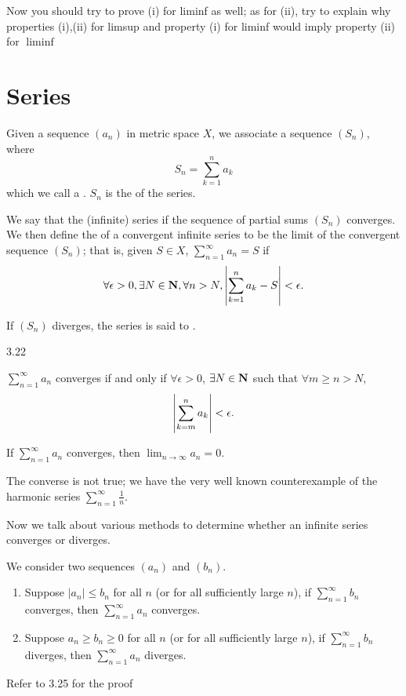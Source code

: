 Now you should try to prove (i) for liminf as well; as for (ii), try to explain why properties (i),(ii) for limsup and property (i) for liminf would imply property (ii) for $\liminf$

\section{Series}
\begin{definition}[Series]
Given a sequence $(a_n)$ in metric space $X$, we associate a sequence $(S_n)$, where
\[S_n=\sum_{k=1}^n a_k\]
which we call a . $S_n$ is the  of the series.

We say that the (infinite) series  if the sequence of partial sums $(S_n)$ converges. We then define the  of a convergent infinite series to be the limit of the convergent sequence $(S_n)$; that is, given $S\in X$, $\sum_{n=1}^\infty a_n=S$ if
\[\forall\epsilon>0,\exists N\in\mathbf N,\forall n>N,\left|\sum_{k=1}^n a_k-S\right|<\epsilon.\]

If $(S_n)$ diverges, the series is said to .
\end{definition}

3.22
\begin{proposition}
$\sum_{n=1}^\infty a_n$ converges if and only if $\forall\epsilon>0$, $\exists N\in\mathbf N$ such that $\forall m\ge n>N$,
\[\left|\sum_{k=m}^n a_k\right|<\epsilon.\]
\end{proposition}

\begin{corollary}
If $\sum_{n=1}^\infty a_n$ converges, then $\lim_{n\to\infty}a_n=0$.
\end{corollary}

\begin{remark}
The converse is not true; we have the very well known counterexample of the harmonic series $\sum_{n=1}^\infty\frac{1}{n}$.
\end{remark}

Now we talk about various methods to determine whether an infinite series converges or diverges.

\begin{lemma}
We consider two sequences $(a_n)$ and $(b_n)$.
\begin{enumerate}[label=(\arabic*)]
\item Suppose $|a_n|\le b_n$ for all $n$ (or for all sufficiently large $n$), if $\sum_{n=1}^\infty b_n$ converges, then $\sum_{n=1}^\infty a_n$ converges.
\item Suppose $a_n\ge b_n\ge0$ for all $n$ (or for all sufficiently large $n$), if $\sum_{n=1}^\infty b_n$ diverges, then $\sum_{n=1}^\infty a_n$ diverges.
\end{enumerate}
\end{lemma}
Refer to 3.25 for the proof

